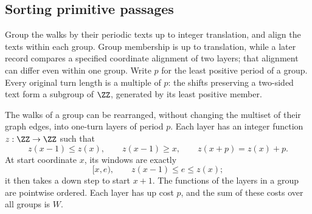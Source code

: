 \subsection{Sorting primitive passages}

Group the walks by their periodic texts up to integer translation, and align the texts within each group. Group membership is up to translation, while a later record compares a specified coordinate alignment of two layers; that alignment can differ even within one group. Write $p$ for the least positive period of a group. Every original turn length is a multiple of $p$: the shifts preserving a two-sided text form a subgroup of $\ZZ$, generated by its least positive member.

\begin{lemma}\label{lem:layers}
The walks of a group can be rearranged, without changing the multiset of their graph edges, into one-turn layers of period $p$. Each layer has an integer function $z:\ZZ\to\ZZ$ such that
\begin{equation}\label{eq:layer-properties}
z(x-1)\le z(x),\qquad z(x-1)\ge x,
\qquad z(x+p)=z(x)+p.
\end{equation}
At start coordinate $x$, its windows are exactly
\begin{equation}\label{eq:layer-vertical}
[x,e),\qquad z(x-1)\le e\le z(x);
\end{equation}
it then takes a down step to start $x+1$. The functions of the layers in a group are pointwise ordered. Each layer has up cost $p$, and the sum of these costs over all groups is $W$.
\end{lemma}

